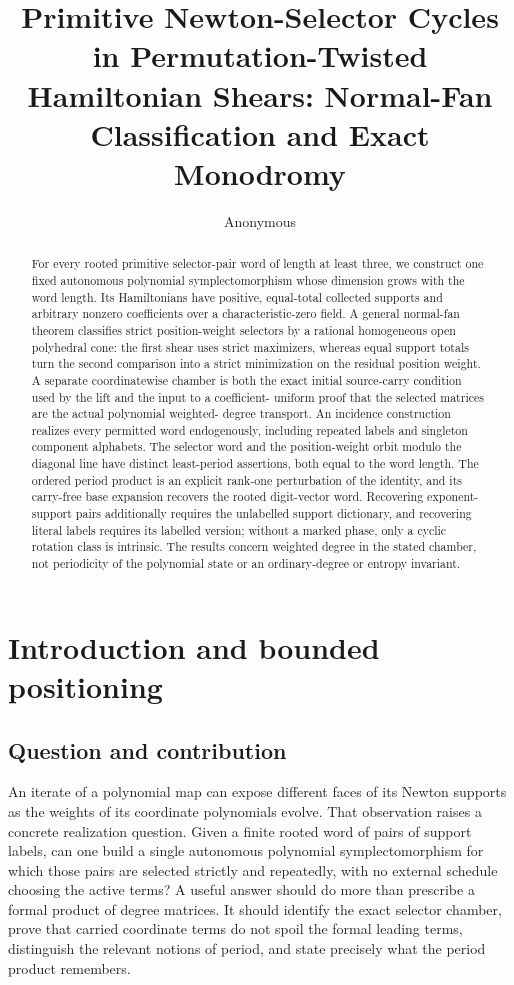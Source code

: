\documentclass[11pt,letterpaper]{article}
\title{Primitive Newton-Selector Cycles in Permutation-Twisted Hamiltonian Shears: Normal-Fan Classification and Exact Monodromy}
\author{Anonymous}
\date{}
\theoremstyle{definition}
\theoremstyle{remark}
\numberwithin{equation}{section}
\begin{document}
\maketitle

\begin{abstract}
For every rooted primitive selector-pair word of length at least three, we
construct one fixed autonomous polynomial symplectomorphism whose dimension
grows with the word length.  Its Hamiltonians have positive, equal-total
collected supports and arbitrary nonzero coefficients over a
characteristic-zero field.  A general normal-fan theorem classifies strict
position-weight selectors by a rational homogeneous open polyhedral cone:
the first shear uses strict maximizers, whereas equal support totals turn the
second comparison into a strict minimization on the residual position
weight.  A separate coordinatewise chamber is both the exact initial
source-carry condition used by the lift and the input to a coefficient-
uniform proof that the selected matrices are the actual polynomial weighted-
degree transport.  An incidence construction realizes every permitted word
endogenously, including repeated labels and singleton component alphabets.
The selector word and the position-weight orbit modulo the diagonal line
have distinct least-period assertions, both equal to the word length.  The
ordered period product is an explicit rank-one perturbation of the identity,
and its carry-free base expansion recovers the rooted digit-vector word.
Recovering exponent-support pairs additionally requires the unlabelled
support dictionary, and recovering literal labels requires its labelled
version; without a marked phase, only a cyclic rotation class is intrinsic.
The results concern weighted degree in the stated chamber, not periodicity of
the polynomial state or an ordinary-degree or entropy invariant.
\end{abstract}

\section{Introduction and bounded positioning}

\subsection{Question and contribution}

An iterate of a polynomial map can expose different faces of its Newton
supports as the weights of its coordinate polynomials evolve.  That
observation raises a concrete realization question.  Given a finite rooted
word of pairs of support labels, can one build a single autonomous
polynomial symplectomorphism for which those pairs are selected strictly and
repeatedly, with no external schedule choosing the active terms?  A useful
answer should do more than prescribe a formal product of degree matrices.  It
should identify the exact selector chamber, prove that carried coordinate
terms do not spoil the formal leading terms, distinguish the relevant
notions of period, and state precisely what the period product remembers.
\end{document}
